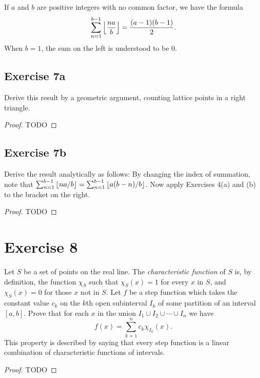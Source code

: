 \documentclass{article}
\begin{document}
If $a$ and $b$ are positive integers with no common factor, we have the formula
  $$\sum_{n=1}^{b-1} \left\lfloor\frac{na}{b}\right\rfloor = \frac{(a - 1)(b - 1)}{2}.$$
When $b = 1$, the sum on the left is understood to be $0$.

\subsection{Exercise 7a}%
\label{sub:exercise-7a}

Derive this result by a geometric argument, counting lattice points in a right
  triangle.

\begin{proof}

  TODO

\end{proof}

\subsection{Exercise 7b}%
\label{sub:exercise-7b}

Derive the result analytically as follows:
By changing the index of summation, note that
  $\sum_{n=1}^{b-1} \left\lfloor na / b\right\rfloor = \sum_{n=1}^{b-1} \left\lfloor a(b - n) / b\right\rfloor$.
Now apply Exercises 4(a) and (b) to the bracket on the right.

\begin{proof}

  TODO

\end{proof}

\section{Exercise 8}%
\label{sec:exercise-8}

Let $S$ be a set of points on the real line.
The \textit{characteristic function} of $S$ is, by definition, the function
  $\chi_S$ such that $\chi_S(x) = 1$ for every $x$ in $S$, and $\chi_S(x) = 0$
  for those $x$ not in $S$.
Let $f$ be a step function which takes the constant value $c_k$ on the $k$th
  open subinterval $I_k$ of some partition of an interval $[a, b]$.
Prove that for each $x$ in the union $I_1 \cup I_2 \cup \cdots \cup I_n$ we have
  $$f(x) = \sum_{k=1}^n c_k\chi_{I_k}(x).$$
This property is described by saying that every step function is a linear
  combination of characteristic functions of intervals.

\begin{proof}

  TODO

\end{proof}
\end{document}
